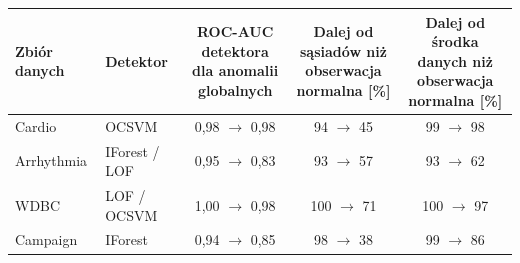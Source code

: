 \begin{tabular}{llccc}
\toprule
Zbiór danych & Detektor & \makecell[r]{ROC-AUC detektora\\dla anomalii globalnych} & \makecell[r]{Dalej od sąsiadów niż\\obserwacja normalna [\%]} & \makecell[r]{Dalej od środka danych niż\\obserwacja normalna [\%]} \\
\midrule
Cardio & OCSVM & 0,98 $\rightarrow$ 0,98 & 94 $\rightarrow$ 45 & 99 $\rightarrow$ 98 \\
Arrhythmia & IForest / LOF & 0,95 $\rightarrow$ 0,83 & 93 $\rightarrow$ 57 & 93 $\rightarrow$ 62 \\
WDBC & LOF / OCSVM & 1,00 $\rightarrow$ 0,98 & 100 $\rightarrow$ 71 & 100 $\rightarrow$ 97 \\
Campaign & IForest & 0,94 $\rightarrow$ 0,85 & 98 $\rightarrow$ 38 & 99 $\rightarrow$ 86 \\
\bottomrule
\end{tabular}
